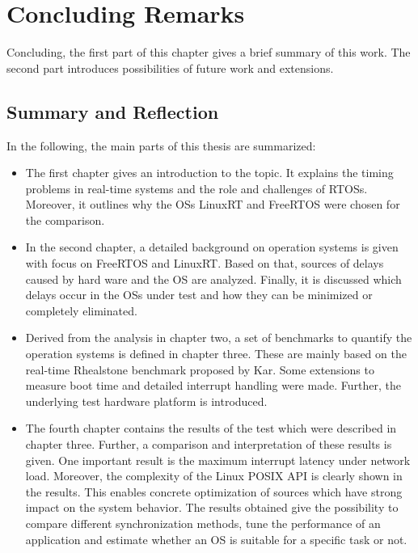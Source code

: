 \chapter{Concluding Remarks}\label{ch_conclusion}
Concluding, the first part of this chapter gives a brief summary of this work.
The second part introduces possibilities of future work and extensions.

\section{Summary and Reflection}   
In the following, the main parts of this thesis are summarized:

\begin{itemize}
	\item 
	The first chapter gives an introduction to the topic. 
	It explains the timing problems in real-time systems and the role and challenges of \acp{RTOS}.
	Moreover, it outlines why the \acp{OS} LinuxRT and FreeRTOS were chosen for the comparison.
	\item
	In the second chapter, a detailed background on operation systems is given with focus on FreeRTOS and LinuxRT.
	Based on that, sources of delays caused by hard ware and the \ac{OS} are analyzed.
	Finally, it is discussed which delays occur in the \acp{OS} under test and how they can be minimized or completely eliminated.
	\item
	Derived from the analysis in chapter two, a set of benchmarks to quantify the operation systems is defined in chapter three.
	These are mainly based on the real-time Rhealstone benchmark proposed by Kar.
	Some extensions to measure boot time and detailed interrupt handling were made.
	Further, the underlying test hardware platform is introduced.
	\item
	The fourth chapter contains the results of the test which were described in chapter three.
	Further, a comparison and interpretation of these results is given.
	One important result is the maximum interrupt latency under network load.
	Moreover, the complexity of the Linux POSIX \ac{API} is clearly shown in the results.
	This enables concrete optimization of sources which have strong impact on the system behavior.	
	The results obtained give the possibility to compare different synchronization methods, tune the performance of an application and estimate whether an \ac{OS} is suitable for a specific task or not.
\end{itemize}


